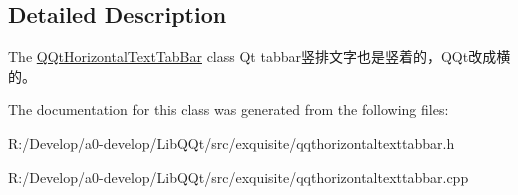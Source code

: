 \subsection{Detailed Description}
The \mbox{\hyperlink{class_q_qt_horizontal_text_tab_bar}{Q\+Qt\+Horizontal\+Text\+Tab\+Bar}} class Qt tabbar竖排文字也是竖着的，\+Q\+Qt改成横的。 

The documentation for this class was generated from the following files\+:\begin{DoxyCompactItemize}
\item 
R\+:/\+Develop/a0-\/develop/\+Lib\+Q\+Qt/src/exquisite/qqthorizontaltexttabbar.\+h\item 
R\+:/\+Develop/a0-\/develop/\+Lib\+Q\+Qt/src/exquisite/qqthorizontaltexttabbar.\+cpp\end{DoxyCompactItemize}
